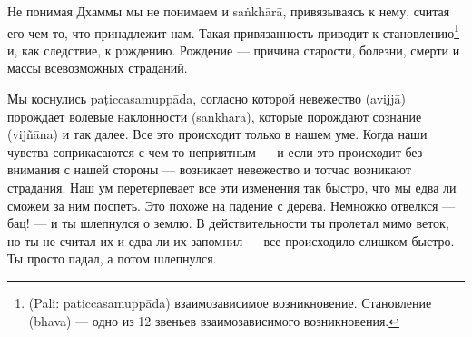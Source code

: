 Не понимая Дхаммы мы не понимаем и sa\.nkh\={a}r\={a}, привязываясь к нему, считая его чем-то, что принадлежит нам. Такая привязанность приводит к становлению\footnote{(Pali: paticcasamupp\={a}da) взаимозависимое возникновение. Становление (bhava) — одно из 12 звеньев взаимозависимого возникновения.} и, как следствие, к рождению. Рождение — причина старости, болезни, смерти и массы всевозможных страданий.

Мы коснулись pa\d{t}iccasamupp\={a}da, согласно которой невежество (avijj\={a}) порождает волевые наклонности (sa\.nkh\={a}r\={a}), которые порождают сознание (vij\~{n}\={a}na) и так далее. Все это происходит только в нашем уме. Когда наши чувства соприкасаются с чем-то неприятным — и если это происходит без внимания с нашей стороны — возникает невежество и тотчас возникают страдания. Наш ум перетерпевает все эти изменения так быстро, что мы едва ли сможем за ним поспеть. Это похоже на падение с дерева. Немножко отвелкся — бац! — и ты шлепнулся о землю. В действительности ты пролетал мимо веток, но ты не считал их и едва ли их запомнил — все происходило слишком быстро. Ты просто падал, а потом шлепнулся.

